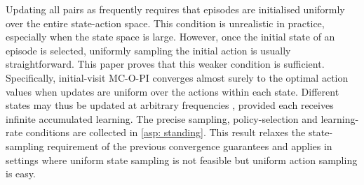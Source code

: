 \documentclass[twoside,11pt]{article}
\DeclareRobustCommand{\reviewbarstart}{%
  \ifhmode %
    \vadjust{\vbox to 0pt{%
      \vskip-\ht\strutbox %
      \vskip-\dp\strutbox %
      \cbstart[\changebarwidth] %
      \vss %
    }}%
  \else %
    \cbstart[\changebarwidth]%
  \fi %
} %
\providecommand{\DIFadd}[1]{#1} %
\providecommand{\DIFaddbegin}{\reviewbarstart} %
\providecommand{\DIFaddend}{\protect\cbend} %
\def\DIFadd#1{#1}%
\def\DIFaddbegin{}%
\def\DIFaddend{}%
\begin{document}
Updating all pairs as frequently requires that episodes are initialised uniformly over the entire state-action space.
This condition is unrealistic in practice, especially when the state space is large.
However, once the initial state of an episode is selected, uniformly sampling the initial action is usually straightforward.
This paper proves that this weaker condition is sufficient.
Specifically, initial-visit MC-O-PI converges almost surely to the optimal action values when updates are uniform over the actions within each state.
Different states may thus be updated at arbitrary frequencies \DIFaddbegin \DIFadd{, provided each receives infinite accumulated learning. The precise sampling, policy-selection and learning-rate conditions are collected in \autoref{asp: standing}.
This result relaxes the state-sampling requirement of the }\DIFaddend previous convergence guarantees
and applies in settings where uniform state sampling is not feasible but uniform action sampling is easy.


\end{document}
